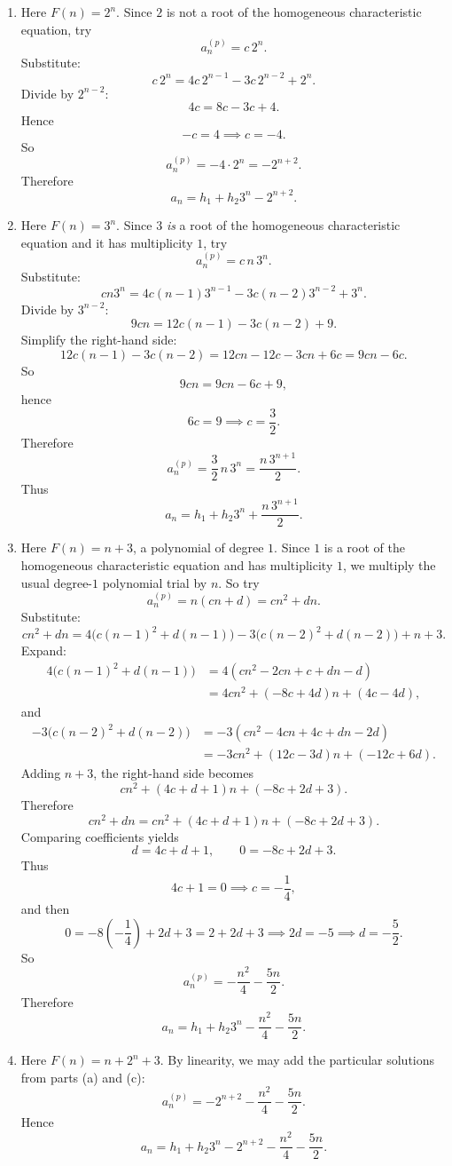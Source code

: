\documentclass[12pt]{article}
\begin{document}
\begin{enumerate}[label=(\alph*)]
\item Here \(F(n)=2^n\). Since \(2\) is not a root of the homogeneous characteristic equation, try
\[
a_n^{(p)}=c\,2^n.
\]
Substitute:
\[
c\,2^n=4c\,2^{n-1}-3c\,2^{n-2}+2^n.
\]
Divide by \(2^{n-2}\):
\[
4c=8c-3c+4.
\]
Hence
\[
-c=4 \implies c=-4.
\]
So
\[
a_n^{(p)}=-4\cdot 2^n=-2^{n+2}.
\]
Therefore
\[
\boxed{a_n=h_1+h_2 3^n-2^{n+2}.}
\]

\item Here \(F(n)=3^n\). Since \(3\) \emph{is} a root of the homogeneous characteristic equation and it has multiplicity \(1\), try
\[
a_n^{(p)}=c\,n\,3^n.
\]
Substitute:
\[
cn3^n=4c(n-1)3^{n-1}-3c(n-2)3^{n-2}+3^n.
\]
Divide by \(3^{n-2}\):
\[
9cn=12c(n-1)-3c(n-2)+9.
\]
Simplify the right-hand side:
\[
12c(n-1)-3c(n-2)=12cn-12c-3cn+6c=9cn-6c.
\]
So
\[
9cn=9cn-6c+9,
\]
hence
\[
6c=9 \implies c=\frac32.
\]
Therefore
\[
a_n^{(p)}=\frac32\,n\,3^n=\frac{n\,3^{n+1}}{2}.
\]
Thus
\[
\boxed{a_n=h_1+h_2 3^n+\frac{n\,3^{n+1}}{2}.}
\]

\item Here \(F(n)=n+3\), a polynomial of degree \(1\). Since \(1\) is a root of the homogeneous characteristic equation and has multiplicity \(1\), we multiply the usual degree-\(1\) polynomial trial by \(n\). So try
\[
a_n^{(p)}=n(cn+d)=cn^2+dn.
\]
Substitute:
\[
cn^2+dn
=
4\bigl(c(n-1)^2+d(n-1)\bigr)-3\bigl(c(n-2)^2+d(n-2)\bigr)+n+3.
\]
Expand:
\begin{align*}
4\bigl(c(n-1)^2+d(n-1)\bigr)
&=4(cn^2-2cn+c+dn-d)\\
&=4cn^2+(-8c+4d)n+(4c-4d),
\end{align*}
and
\begin{align*}
-3\bigl(c(n-2)^2+d(n-2)\bigr)
&=-3(cn^2-4cn+4c+dn-2d)\\
&=-3cn^2+(12c-3d)n+(-12c+6d).
\end{align*}
Adding \(n+3\), the right-hand side becomes
\[
cn^2+(4c+d+1)n+(-8c+2d+3).
\]
Therefore
\[
cn^2+dn=cn^2+(4c+d+1)n+(-8c+2d+3).
\]
Comparing coefficients yields
\[
d=4c+d+1,\qquad 0=-8c+2d+3.
\]
Thus
\[
4c+1=0 \implies c=-\frac14,
\]
and then
\[
0=-8\left(-\frac14\right)+2d+3=2+2d+3
\implies 2d=-5 \implies d=-\frac52.
\]
So
\[
a_n^{(p)}=-\frac{n^2}{4}-\frac{5n}{2}.
\]
Therefore
\[
\boxed{a_n=h_1+h_2 3^n-\frac{n^2}{4}-\frac{5n}{2}.}
\]

\item Here \(F(n)=n+2^n+3\). By linearity, we may add the particular solutions from parts (a) and (c):
\[
a_n^{(p)}=-2^{n+2}-\frac{n^2}{4}-\frac{5n}{2}.
\]
Hence
\[
\boxed{a_n=h_1+h_2 3^n-2^{n+2}-\frac{n^2}{4}-\frac{5n}{2}.}
\]
\end{enumerate}
\end{document}
